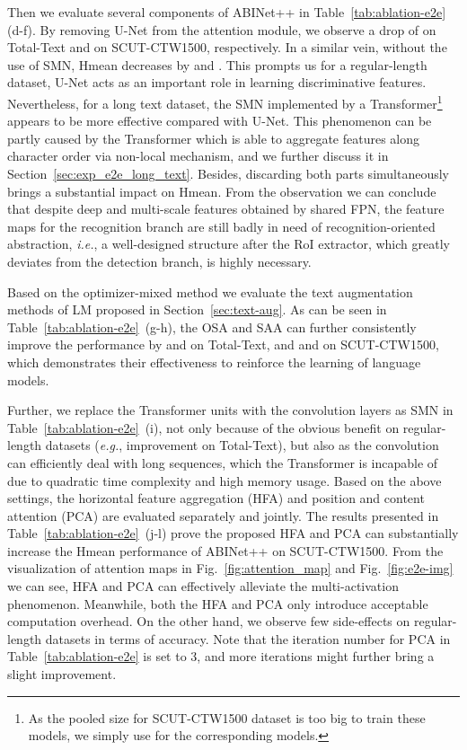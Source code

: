 \documentclass[10pt,journal,compsoc]{IEEEtran}
\def\ie{{\it i.e.}\xspace}
\def\eg{{\it e.g.}\xspace}
\begin{document}
Then we evaluate several components of ABINet++ in Table~\ref{tab:ablation-e2e} (d-f). By removing U-Net from the attention module, we observe a drop of  on Total-Text and  on SCUT-CTW1500, respectively. In a similar vein, without the use of SMN, Hmean decreases by  and . This prompts us for a regular-length dataset, U-Net acts as an important role in learning discriminative features. Nevertheless, for a long text dataset, the SMN implemented by a Transformer\footnote{As the  pooled size for SCUT-CTW1500 dataset is too big to train these models, we simply use  for the corresponding models.} appears to be more effective compared with U-Net. This phenomenon can be partly caused by the Transformer which is able to aggregate features along character order via non-local mechanism, and we further discuss it in Section~\ref{sec:exp_e2e_long_text}. Besides, discarding both parts simultaneously brings a substantial impact on Hmean. From the observation we can conclude that despite deep and multi-scale features obtained by shared FPN, the feature maps for the recognition branch are still badly in need of recognition-oriented abstraction, \ie, a well-designed structure after the RoI extractor, which greatly deviates from the detection branch, is highly necessary.


Based on the optimizer-mixed method we evaluate the text augmentation methods of LM proposed in Section~\ref{sec:text-aug}. As can be seen in Table~\ref{tab:ablation-e2e}~(g-h), the OSA and SAA can further consistently improve the performance by  and  on Total-Text, and  and  on SCUT-CTW1500, which demonstrates their effectiveness to reinforce the learning of language models. 


Further, we replace the Transformer units with the convolution layers as SMN in Table~\ref{tab:ablation-e2e}~(i), not only because of the obvious benefit on regular-length datasets (\eg,  improvement on Total-Text), but also as the convolution can efficiently deal with long sequences, which the Transformer is incapable of due to quadratic time complexity and high memory usage. Based on the above settings, the horizontal feature aggregation (HFA) and position and content attention (PCA) are evaluated separately and jointly. The results presented in Table~\ref{tab:ablation-e2e}~(j-l) prove the proposed HFA and PCA can substantially increase the Hmean performance of ABINet++ on SCUT-CTW1500. From the visualization of attention maps in Fig.~\ref{fig:attention_map} and Fig.~\ref{fig:e2e-img} we can see, HFA and PCA can effectively alleviate the multi-activation phenomenon. Meanwhile, both the HFA and PCA only introduce acceptable computation overhead. On the other hand, we observe few side-effects on regular-length datasets in terms of accuracy. Note that the iteration number for PCA in Table~\ref{tab:ablation-e2e} is set to 3, and more iterations might further bring a slight improvement.
\end{document}
